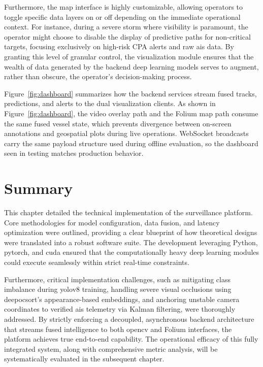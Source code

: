 Furthermore, the map interface is highly customizable, allowing operators to toggle specific data layers on or off depending on the immediate operational context. For instance, during a severe storm where visibility is paramount, the operator might choose to disable the display of predictive paths for non-critical targets, focusing exclusively on high-risk CPA alerts and raw \gls{ais} data. By granting this level of granular control, the visualization module ensures that the wealth of data generated by the backend deep learning models serves to augment, rather than obscure, the operator's decision-making process.
\begin{reportfigblock}
Figure~\ref{fig:dashboard} summarizes how the backend services stream fused tracks, predictions, and alerts to the dual visualization clients.
As shown in Figure~\ref{fig:dashboard}, the video overlay path and the Folium map path consume the same fused vessel state, which prevents divergence between on-screen annotations and geospatial plots during live operations. WebSocket broadcasts carry the same payload structure used during offline evaluation, so the dashboard seen in testing matches production behavior.
\end{reportfigblock}

\section{Summary}
This chapter detailed the technical implementation of the surveillance platform. Core methodologies for model configuration, data fusion, and latency optimization were outlined, providing a clear blueprint of how theoretical designs were translated into a robust software suite. The development leveraging Python, \gls{pytorch}, and \gls{cuda} ensured that the computationally heavy deep learning modules could execute seamlessly within strict real-time constraints.

Furthermore, critical implementation challenges, such as mitigating class imbalance during \gls{yolo}v8 training, handling severe visual occlusions using \gls{deepocsort}'s appearance-based embeddings, and anchoring unstable camera coordinates to verified \gls{ais} telemetry via Kalman filtering, were thoroughly addressed. By strictly enforcing a decoupled, asynchronous backend architecture that streams fused intelligence to both \gls{opencv} and Folium interfaces, the platform achieves true end-to-end capability. The operational efficacy of this fully integrated system, along with comprehensive metric analysis, will be systematically evaluated in the subsequent chapter.

